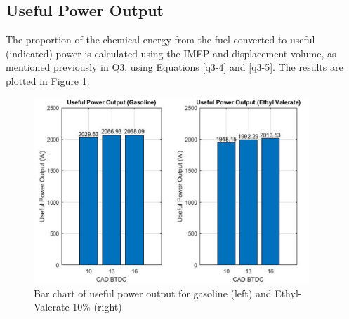 \documentclass[11pt]{article}
\begin{document}
\subsection*{Useful Power Output}
The proportion of the chemical energy from the fuel converted to useful (indicated) power is calculated using the IMEP and displacement volume, as mentioned previously in Q3, using Equations \ref{q3-4} and \ref{q3-5}. The results are plotted in Figure \ref{q4-f2}.
\begin{figure}[H]
	\centering
    \includegraphics[height = 7cm]{./img/diagram17.png}
    \caption{Bar chart of useful power output for gasoline (left) and Ethyl-Valerate 10\% (right)}
    \label{q4-f2}
\end{figure}
\end{document}
